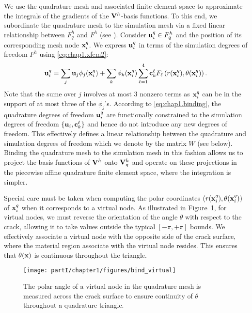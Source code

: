 We use the quadrature mesh and associated finite element space to approximate the integrals of the gradients of the $\mathbf{V}^h$-basis functions. To this end, we subordinate the quadrature mesh to the simulation mesh via a fixed linear relationship between $F_q^h$ and $F^h$ (see \cite{Sifakis07b}). Consider $\mathbf{u}^q_i \in F_q^h$ and the position of its corresponding mesh node $\mathbf{x}^q_i$. We express $\mathbf{u}^q_i$ in terms of the simulation degrees of freedom $F^h$ using \eqref{eq:chap1.xfem2}:
\begin{equation} \label{eq:chap1.binding}
\mathbf{u}^q_i = \sum_j \mathbf{u}_j \phi_j(\mathbf{x}^q_i) + \sum_k \phi_k(\mathbf{x}^q_i) \sum_{\ell = 1}^4 \mathbf{c}_k^{\ell} F_{\ell} \left( r(\mathbf{x}^q_i), \theta(\mathbf{x}^q_i) \right).
\end{equation}
Note that the sume over $j$ involves at most $3$ nonzero terms as $\mathbf{x}^q_i$ can be in the support of at most three of the $\phi_j$'s. According to \eqref{eq:chap1.binding}, the quadrature degrees of freedom $\mathbf{u}^q_i$ are functionally constrained to the simulation degrees of freedom $\{\mathbf{u}_i, \mathbf{c}_k^{\ell}\}$ and hence do not introduce any new degrees of freedom. This effectively defines a linear relationship between the quadrature and simulation degrees of freedom which we denote by the matrix $W$ (see below). Binding the quadrature mesh to the simulation mesh in this fashion allows us to project the basis functions of $\mathbf{V}^h$ onto $\mathbf{V}_q^h$ and operate on these projections in the piecewise affine quadrature finite element space, where the integration is simpler.

Special care must be taken when computing the polar coordinates $(r(\mathbf{x}^q_i), \theta(\mathbf{x}^q_i))$ of $\mathbf{x}^q_i$ when it corresponds to a virtual node. As illustrated in Figure~\ref{fig:chap1.binding.virtual}, for virtual nodes, we must reverse the orientation of the angle $\theta$ with respect to the crack, allowing it to take values outside the typical $[-\pi,+\pi]$ bounds. We effectively associate a virtual node with the opposite side of the crack surface, where the material region associate with the virtual node resides. This ensures that $\theta(\mathbf{x})$ is continuous throughout the triangle.

\setlength{\figurewidth}{0.50\textwidth}
\begin{figure}[htbp]
\centering
\texttt{[image: partI/chapter1/figures/bind\_virtual]}
\caption{The polar angle of a virtual node in the quadrature mesh is measured across the crack surface to ensure continuity of $\theta$ throughout a quadrature triangle.}
\label{fig:chap1.binding.virtual}
\end{figure}

